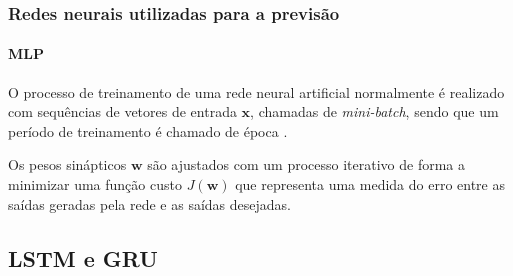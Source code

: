\documentclass{beamer}
\begin{document}
\begin{frame}
\frametitle{Redes neurais utilizadas para a previsão}
\framesubtitle{MLP}
\justifying O processo de treinamento de uma rede neural artificial normalmente é realizado com sequências de vetores de entrada $\mathbf{x}$, chamadas de \textit{mini-batch}, sendo que um período de treinamento é chamado de época \cite{geron2019hands}. 

Os pesos sinápticos $\textbf{w}$ são ajustados com um processo iterativo de forma a minimizar uma função custo $J(\textbf{w})$ que representa uma medida do erro entre as saídas geradas pela rede e as saídas desejadas. 
\end{frame}

\subsection{LSTM e GRU}
\end{document}
